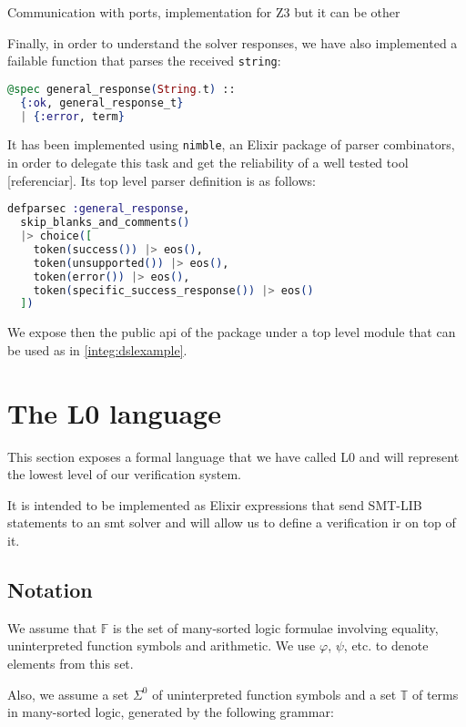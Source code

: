 Communication with ports, implementation for Z3 but it can be other

Finally, in order to understand the solver responses, we have also implemented
a failable function that parses the received \verb|string|:

\begin{lstlisting}[language=elixir,numbers=none,frame=none]
@spec general_response(String.t) :: 
  {:ok, general_response_t} 
  | {:error, term}
\end{lstlisting}

It has been implemented using \verb|nimble|, an Elixir package of parser
combinators, in order to delegate this task and get the reliability of a well
tested tool [referenciar]. Its top level parser definition is as follows:

\begin{lstlisting}[language=elixir,numbers=none,frame=none]
defparsec :general_response,
  skip_blanks_and_comments()
  |> choice([
    token(success()) |> eos(),
    token(unsupported()) |> eos(),
    token(error()) |> eos(),
    token(specific_success_response()) |> eos()
  ])
\end{lstlisting}

We expose then the public \gls{api} of the package under a top level module
that can be used as in \ref{integ:dslexample}.

\section{The L0 language}

This section exposes a formal language that we have called L0 and will
represent the lowest level of our verification system.

It is intended to be implemented as Elixir expressions that send SMT-LIB 
statements to an \acrshort{smt} solver and will allow us to define a
verification \gls{ir} on top of it.

\subsection{Notation}

We assume that $\mathbb{F}$ is the set of many-sorted logic formulae involving
equality, uninterpreted function symbols and arithmetic. We use $\varphi$, 
$\psi$, etc. to denote elements from this set.

Also, we assume a set $\Sigma^{0}$ of uninterpreted function symbols and a set
$\mathbb{T}$ of terms in many-sorted logic, generated by the following grammar:

